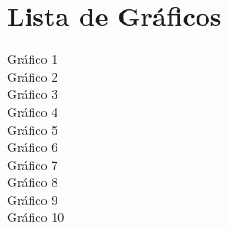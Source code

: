 \section*{Lista de Gráficos}
\vspace*{1.5cm} %
\thispagestyle{empty}
    \begin{onehalfspace}
        Gráfico 1\\
        Gráfico 2\\
        Gráfico 3\\
        Gráfico 4\\
        Gráfico 5\\
        Gráfico 6\\
        Gráfico 7\\
        Gráfico 8\\
        Gráfico 9\\
        Gráfico 10\\
    \end{onehalfspace}